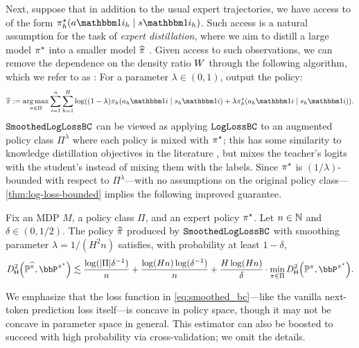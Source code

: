 Next, suppose that in addition to the usual expert trajectories, we have access to \emph{\densobs} of the form $\pistar_h(a\ind{i}_h\mid{}s\ind{i}_h)$. Such access is a natural assumption for the task of \emph{expert distillation}, where we aim to distill a large model $\pi^{\star}$ into a smaller model $\widehat{\pi}$ \citep{hinton2015distilling}. Given access to such observations, we can remove the dependence on the density ratio $W$ through the following algorithm, which we refer to as \smoothedloglossbc: For a parameter $\lambda\in(0,1)$, output the policy:{\setlength{\abovedisplayskip}{3pt}
\setlength{\belowdisplayskip}{3pt}
\begin{align}
  \label{eq:smoothed_bc}
  \pihat := \argmax_{\pi\in\Pi} \sum_{i=1}^n \sum_{h=1}^H \log ((1-\lambda)\pihi +\lambda \pistarhi).
  \end{align}}%
  $\texttt{SmoothedLogLossBC}$ can be viewed as applying $\texttt{LogLossBC}$ to an augmented policy class $\Pi^\lambda$ where each policy is mixed with $\pi^{\star}$; this has some similarity to knowledge distillation objectives in the literature \citep{hinton2015distilling,lopez2015unifying}, but mixes the teacher's logits with the student's instead of mixing them with the labels. Since $\pi^{\star}$ is $(1/\lambda)$-bounded with respect to $\Pi^\lambda$---with no assumptions on the original policy class---\cref{thm:log-loss-bounded} implies the following improved guarantee.\loose
  \begin{corollary}
    \label{thm:layerwise_smoothing}
Fix an MDP $M$, a policy class $\Pi$, and an expert policy $\pi^{\star}$. Let $n \in \mathbb{N}$ and $\delta \in (0,1/2)$. The policy $\widehat{\pi}$ produced by $\texttt{SmoothedLogLossBC}$ with smoothing parameter $\lambda = 1/(H^2n)$ satisfies, with probability at least $1-\delta$,\loose
\begin{equation} \Dhels{\BP^{\pihat}}{\bbP^{\pistar}} \lesssim \frac{\log(|\Pi|\delta^{-1})}{n} + \frac{\log(Hn)\log(\delta^{-1})}{n} + \frac{H\log(Hn)}{\delta} \cdot \min_{\pi \in \Pi} \Dhels{\BP^\pi}{\bbP^{\pistar}}.
\end{equation}
\end{corollary}
We emphasize that the loss function in \cref{eq:smoothed_bc}---like the vanilla next-token prediction loss itself---is concave in policy space, though it may not be concave in parameter space in general. This estimator can also be boosted to succeed with high probability via cross-validation; we omit the details.


